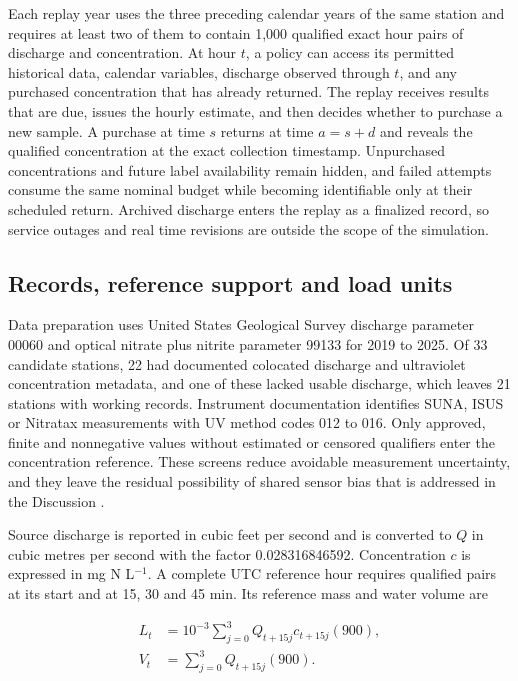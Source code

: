 \documentclass[pdflatex,sn-mathphys-num]{sn-jnl}%
\theoremstyle{thmstyleone}%
\theoremstyle{thmstyletwo}%
\theoremstyle{thmstylethree}%
\begin{document}
Each replay year uses the three preceding calendar years of the same station and requires at least two of them to contain 1,000 qualified exact hour pairs of discharge and concentration. At hour $t$, a policy can access its permitted historical data, calendar variables, discharge observed through $t$, and any purchased concentration that has already returned. The replay receives results that are due, issues the hourly estimate, and then decides whether to purchase a new sample. A purchase at time $s$ returns at time $a=s+d$ and reveals the qualified concentration at the exact collection timestamp. Unpurchased concentrations and future label availability remain hidden, and failed attempts consume the same nominal budget while becoming identifiable only at their scheduled return. Archived discharge enters the replay as a finalized record, so service outages and real time revisions are outside the scope of the simulation.

\subsection{Records, reference support and load units}

Data preparation uses United States Geological Survey discharge parameter 00060 and optical nitrate plus nitrite parameter 99133 for 2019 to 2025. Of 33 candidate stations, 22 had documented colocated discharge and ultraviolet concentration metadata, and one of these lacked usable discharge, which leaves 21 stations with working records. Instrument documentation identifies SUNA, ISUS or Nitratax measurements with UV method codes 012 to 016. Only approved, finite and nonnegative values without estimated or censored qualifiers enter the concentration reference. These screens reduce avoidable measurement uncertainty, and they leave the residual possibility of shared sensor bias that is addressed in the Discussion \citep{wagner2006,pellerin2013}.

Source discharge is reported in cubic feet per second and is converted to $Q$ in cubic metres per second with the factor 0.028316846592. Concentration $c$ is expressed in mg N L$^{-1}$. A complete UTC reference hour requires qualified pairs at its start and at 15, 30 and 45 min. Its reference mass and water volume are

\begin{align}
L_t &= 10^{-3}\sum_{j=0}^{3}Q_{t+15j}c_{t+15j}(900),\\
V_t &= \sum_{j=0}^{3}Q_{t+15j}(900).
\end{align}
\end{document}
